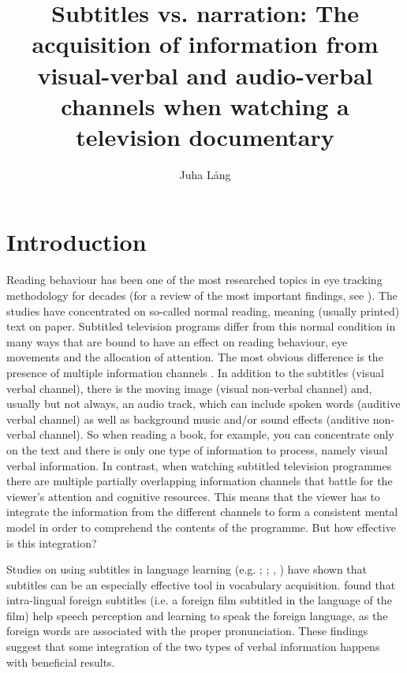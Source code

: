 \documentclass[output=paper]{langsci/langscibook}
\author{Juha Lång\affiliation{University of Eastern Finland}
}
\title{Subtitles vs. narration: {T}he acquisition of information from visual-verbal and audio-verbal channels when watching a television documentary}
\begin{document}
  



\section{Introduction}

Reading behaviour has been one of the most researched topics in eye tracking methodology for decades (for a review of the most important findings, see \citet{Rayner1998, Rayner2009}). The studies have concentrated on so-called normal reading, meaning (usually printed) text on paper. Subtitled television programs differ from this normal condition in many ways that are bound to have an effect on reading behaviour, eye movements and the allocation of attention. The most obvious difference is the presence of multiple information channels \citep{Gottlieb1998}. In addition to the subtitles (visual verbal channel), there is the moving image (visual non-verbal channel) and, usually but not always, an audio track, which can include spoken words (auditive verbal channel) as well as background music and/or sound effects (auditive non-verbal channel). So when reading a book, for example, you can concentrate only on the text and there is only one type of information to process, namely visual verbal information. In contrast, when watching subtitled television programmes there are multiple partially overlapping information channels that battle for the viewer’s attention and cognitive resources. This means that the viewer has to integrate the information from the different channels to form a consistent mental model in order to comprehend the contents of the programme. But how effective is this integration?

Studies on using subtitles in language learning (e.g. \citet{Koolstra1999}; \citet{Latifi2011}; \citet{Etemadi2012}, \citet{Ghia2012}) have shown that subtitles can be an especially effective tool in vocabulary acquisition. \citet{mitterer2009} found that intra-lingual foreign subtitles (i.e. a foreign film subtitled in the language of the film) help speech perception and learning to speak the foreign language, as the foreign words are associated with the proper pronunciation. These findings suggest that some integration of the two types of verbal information happens with beneficial results.
\end{document}

